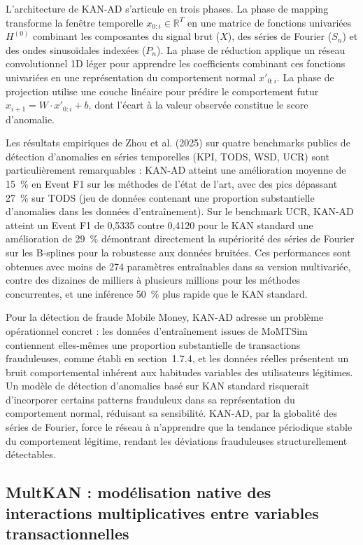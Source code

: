 \documentclass[11pt,a4paper,oneside]{report}
\theoremstyle{definition}
\theoremstyle{remark}
\begin{document}
L'architecture de KAN-AD s'articule en trois phases. La phase de mapping transforme la fenêtre temporelle $x_{0:i} \in \mathbb{R}^T$ en une matrice de fonctions univariées $H^{(0)}$ combinant les composantes du signal brut ($X$), des séries de Fourier ($S_n$) et des ondes sinusoïdales indexées ($P_n$). La phase de réduction applique un réseau convolutionnel 1D léger pour apprendre les coefficients combinant ces fonctions univariées en une représentation du comportement normal $x'_{0:i}$. La phase de projection utilise une couche linéaire pour prédire le comportement futur $x_{i+1} = W \cdot x'_{0:i} + b$, dont l'écart à la valeur observée constitue le score d'anomalie.

Les résultats empiriques de Zhou et al. (2025) sur quatre benchmarks publics de détection d'anomalies en séries temporelles (KPI, TODS, WSD, UCR) sont particulièrement remarquables : KAN-AD atteint une amélioration moyenne de 15~\% en Event F1 sur les méthodes de l'état de l'art, avec des pics dépassant 27~\% sur TODS (jeu de données contenant une proportion substantielle d'anomalies dans les données d'entraînement). Sur le benchmark UCR, KAN-AD atteint un Event F1 de 0,5335 contre 0,4120 pour le KAN standard  une amélioration de 29~\% démontrant directement la supériorité des séries de Fourier sur les B-splines pour la robustesse aux données bruitées. Ces performances sont obtenues avec moins de 274 paramètres entraînables dans sa version multivariée, contre des dizaines de milliers à plusieurs millions pour les méthodes concurrentes, et une inférence 50~\% plus rapide que le KAN standard.

Pour la détection de fraude Mobile Money, KAN-AD adresse un problème opérationnel concret : les données d'entraînement issues de MoMTSim contiennent elles-mêmes une proportion substantielle de transactions frauduleuses, comme établi en section~1.7.4, et les données réelles présentent un bruit comportemental inhérent aux habitudes variables des utilisateurs légitimes. Un modèle de détection d'anomalies basé sur KAN standard risquerait d'incorporer certains patterns frauduleux dans sa représentation du comportement normal, réduisant sa sensibilité. KAN-AD, par la globalité des séries de Fourier, force le réseau à n'apprendre que la tendance périodique stable du comportement légitime, rendant les déviations frauduleuses structurellement détectables.

\subsection{MultKAN : modélisation native des interactions multiplicatives entre variables transactionnelles}
\end{document}
